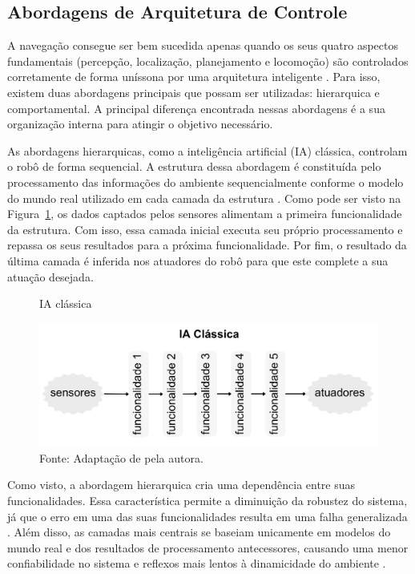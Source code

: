 \subsection{Abordagens de Arquitetura de Controle} 

A navegação consegue ser bem sucedida apenas quando os seus quatro aspectos fundamentais (percepção, localização, planejamento e locomoção) são controlados corretamente de forma uníssona por uma arquitetura inteligente \cite{mobileRobotsSiegwart:2011}. Para isso, existem duas abordagens principais que possam ser utilizadas: hierarquica e comportamental. A principal diferença encontrada nessas abordagens é a sua organização interna para atingir o objetivo necessário.

As abordagens hierarquicas, como a inteligência artificial (IA) clássica, controlam o robô de forma sequencial. A estrutura dessa abordagem é constituída pelo processamento das informações do ambiente sequencialmente conforme o modelo do mundo real utilizado em cada camada da estrutura \cite{practicalIndroductionNehmzow:2012,toroco:2022}. Como pode ser visto na Figura~\ref{fig:iaclassica}, os dados captados pelos sensores alimentam a primeira funcionalidade da estrutura. Com isso, essa camada inicial executa seu próprio processamento e repassa os seus resultados para a próxima funcionalidade. Por fim, o resultado da última camada é inferida nos atuadores do robô para que este complete a sua atuação desejada.

\begin{figure}[h]
    \centering
    \caption{IA clássica}
    \includegraphics[scale=0.3]{iaclassica.png}
    \caption*{Fonte: Adaptação de \citet{brooks85} pela autora.}
    \label{fig:iaclassica}
\end{figure}

Como visto, a abordagem hierarquica cria uma dependência entre suas funcionalidades. Essa característica permite a diminuição da robustez do sistema, já que o erro em uma das suas funcionalidades resulta em uma falha generalizada \cite{practicalIndroductionNehmzow:2012}. Além disso, as camadas mais centrais se baseiam unicamente em modelos do mundo real e dos resultados de processamento antecessores, causando uma menor confiabilidade no sistema e reflexos mais lentos à dinamicidade do ambiente \cite{practicalIndroductionNehmzow:2012}.


